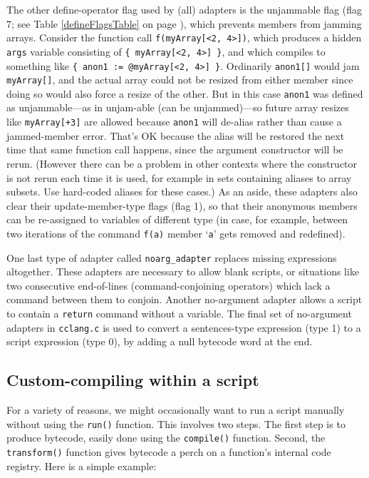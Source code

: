 \documentclass{article}
\begin{document}
The other define-operator flag used by (all) adapters is the unjammable flag (flag 7; see Table \ref{defineFlagsTable} on page \pageref{defineFlagsTable}), which prevents members from jamming arrays.  Consider the function call \verb#f(myArray[<2, 4>])#, which produces a hidden \verb$args$ variable consisting of \verb${ myArray[<2, 4>] }$, and which compiles to something like \verb${ anon1 := @myArray[<2, 4>] }$.  Ordinarily \verb$anon1[]$ would jam \verb$myArray[]$, and the actual array could not be resized from either member since doing so would also force a resize of the other.  But in this case \verb$anon1$ was defined as unjammable---as in unjam-able (can be unjammed)---so future array resizes like \verb#myArray[+3]# are allowed because \verb$anon1$ will de-alias rather than cause a jammed-member error.  That's OK because the alias will be restored the next time that same function call happens, since the argument constructor will be rerun.  (However there can be a problem in other contexts where the constructor is not rerun each time it is used, for example in sets containing aliases to array subsets.  Use hard-coded aliases for these cases.)  As an aside, these adapters also clear their update-member-type flags (flag 1), so that their anonymous members can be re-assigned to variables of different type (in case, for example, between two iterations of the command \verb#f(a)# member `\verb#a#' gets removed and redefined).

One last type of adapter called \verb#noarg_adapter# replaces missing expressions altogether.  These adapters are necessary to allow blank scripts, or situations like two consecutive end-of-lines (command-conjoining operators) which lack a command between them to conjoin.  Another no-argument adapter allows a script to contain a \verb#return# command without a variable.  The final set of no-argument adapters in \verb#cclang.c# is used to convert a sentences-type expression (type 1) to a script expression (type 0), by adding a null bytecode word at the end.\\


 



\subsection{Custom-compiling within a script}

For a variety of reasons, we might occasionally want to run a script manually without using the \verb#run()# function.  This involves two steps.  The first step is to produce bytecode, easily done using the \verb#compile()# function.  Second, the \verb#transform()# function gives bytecode a perch on a function's internal code registry.  Here is a simple example:
\end{document}
